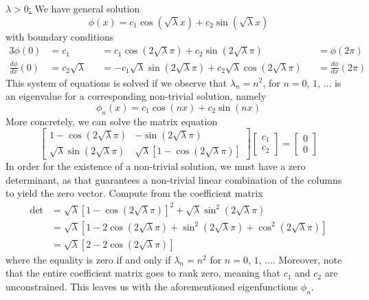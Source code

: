 \documentclass[a4paper]{article}
\begin{document}
\underline{\( \lambda > 0 \):} We have general solution
\[
	\phi \!\left( x \right) = c_{1}\cos\!\left(\sqrt{\lambda}x\right) + c_{2}\sin\!\left(\sqrt{\lambda}x\right) 
\]
with boundary conditions
\begin{alignat*}{3}
	\phi \!\left( 0 \right) & = c_{1} && = c_{1}\cos\!\left(2\sqrt{\lambda}\pi\right) + c_{2}\sin\!\left(2\sqrt{\lambda}\pi\right) && = \phi \!\left( 2 \pi \right) \\
	\frac{d \phi}{d x}\!\left( 0 \right) & = c_{2}\sqrt{\lambda} && = -c_{1}\sqrt{\lambda}\sin\!\left(2 \sqrt{\lambda}\pi \right) + c_{2}\sqrt{\lambda}\cos\!\left(2 \sqrt{\lambda}\pi \right) && = \frac{d \phi}{d x}\!\left( 2 \pi \right)
\end{alignat*}
This system of equations is solved if we observe that \( \lambda_{n} = n^{2} \), for \( n = 0 \), \( 1 \), ... is an eigenvalue for a corresponding non-trivial solution, namely
\[
	\phi_{n}\!\left( x \right) = c_{1}\cos\!\left(nx\right) + c_{2}\sin\!\left(nx\right)
\]
More concretely, we can solve the matrix equation
\[
	\begin{bmatrix}
		1 - \cos\!\left(2 \sqrt{\lambda}\pi \right) & -\sin\!\left(2 \sqrt{\lambda}\pi \right) \\
		\sqrt{\lambda}\sin\!\left(2 \sqrt{\lambda}\pi \right) & \sqrt{\lambda}\!\left[ 1 - \cos\!\left(2 \sqrt{\lambda}\pi \right) \right]
	\end{bmatrix}
	\begin{bmatrix}
		c_{1} \\
		c_{2}
	\end{bmatrix}
	=
	\begin{bmatrix}
		0\\
		0
	\end{bmatrix}
\]
In order for the existence of a non-trivial solution, we must have a zero determinant, as that guarantees a non-trivial linear combination of the columns to yield the zero vector. Compute from the coefficient matrix
\begin{align*}
	\det & = \sqrt{\lambda}\!\left[ 1 - \cos\!\left(2 \sqrt{\lambda}\pi \right) \right]^{2} + \sqrt{\lambda}\sin^{2}\!\left(2 \sqrt{\lambda}\pi \right) \\
	     & = \sqrt{\lambda}\!\left[ 1 - 2 \cos\!\left(2 \sqrt{\lambda}\pi \right) + \sin^{2}\!\left(2 \sqrt{\lambda}\pi \right) + \cos^{2}\!\left(2 \sqrt{\lambda}\pi \right) \right] \\
	     & = \sqrt{\lambda}\!\left[ 2 - 2 \cos\!\left(2 \sqrt{\lambda}\pi \right) \right]
\end{align*}
where the equality is zero if and only if \( \lambda_{n} = n^{2} \) for \( n = 0 \), \( 1 \), .... Moreover, note that the entire coefficient matrix goes to rank zero, meaning that \( c_{1} \) and \( c_{2} \) are unconstrained. This leaves us with the aforementioned eigenfunctions \( \phi_{n} \).
\end{document}
